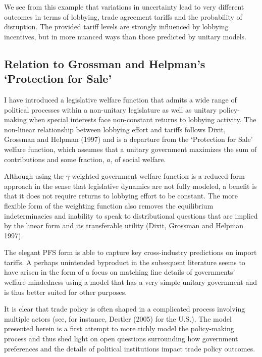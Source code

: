 \documentclass[10pt]{article}
\newcommand{\ga}{\gamma}
\begin{document}
We see from this example that variations in uncertainty lead to very different outcomes in terms of lobbying, trade agreement tariffs and the probability of disruption. The provided tariff levels are strongly influenced by lobbying incentives, but in more nuanced ways than those predicted by unitary models.


\subsection{Relation to Grossman and Helpman's `Protection for Sale'}
\label{sec:gh}
I have introduced a legislative welfare function that admits a wide range of political processes within a non-unitary legislature as well as unitary policy-making when special interests face non-constant returns to lobbying activity. The non-linear relationship between lobbying effort and tariffs follows Dixit, Grossman and Helpman (1997) and is a departure from the `Protection for Sale' welfare function, which assumes that a unitary government maximizes the sum of contributions and some fraction, $a$, of social welfare.

Although using the $\ga$-weighted government welfare function is a reduced-form approach in the sense that legislative dynamics are not fully modeled, a benefit is that it does not require returns to lobbying effort to be constant. The more flexible form of the weighting function also removes the equilibrium indeterminacies and inability to speak to distributional questions that are implied by the linear form and its transferable utility (Dixit, Grossman and Helpman 1997).

The elegant PFS form is able to capture key cross-industry predictions on import tariffs. A perhaps unintended byproduct in the subsequent literature seems to have arisen in the form of a focus on matching fine details of governments' welfare-mindedness using a model that has a very simple unitary government and is thus better suited for other purposes.

It is clear that trade policy is often shaped in a complicated process involving multiple actors (see, for instance, Destler (2005) for the U.S.). The model presented herein is a first attempt to more richly model the policy-making process and thus shed light on open questions surrounding how government preferences and the details of political institutions impact trade policy outcomes.
\end{document}

